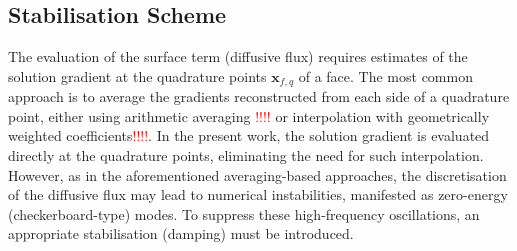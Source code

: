 \documentclass[sn-mathphys,Numbered]{sn-jnl}%
\newcommand{\bb}{\boldsymbol}
\begin{document}
\subsection{Stabilisation Scheme}
\label{sec:vol_int}
%
The evaluation of the surface term (diffusive flux) requires estimates of the solution gradient at the quadrature points $\bb{x}_{f,q}$ of a face.
The most common approach is to average the gradients reconstructed from each side of a quadrature point, either using arithmetic averaging \textcolor{red}{!!!!}\cite{test} or interpolation with geometrically weighted coefficients\cite{test}\textcolor{red}{!!!!}.
In the present work, the solution gradient is evaluated directly at the quadrature points, eliminating the need for such interpolation.
However, as in the aforementioned averaging-based approaches, the discretisation of the diffusive flux may lead to numerical instabilities, manifested as zero-energy (checkerboard-type) modes.
To suppress these high-frequency oscillations, an appropriate stabilisation (damping) must be introduced.
\end{document}
